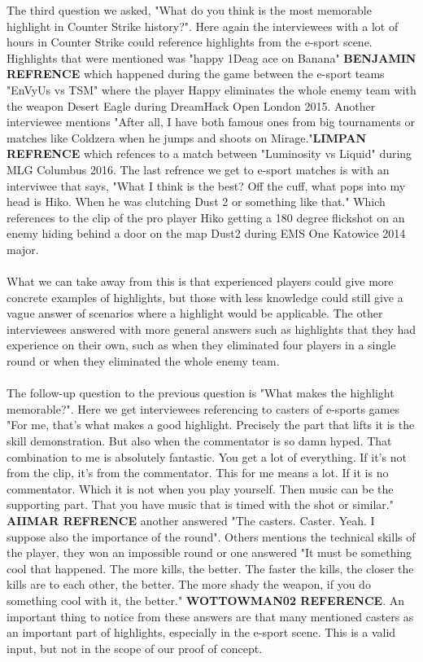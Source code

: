 The third question we asked, "What do you think is the most memorable highlight in Counter Strike history?". Here again the interviewees with a lot of hours in Counter Strike could reference highlights from the e-sport scene. Highlights that were mentioned was "happy 1Deag ace on Banana" \textbf{BENJAMIN REFRENCE} which happened during the game between the e-sport teams "EnVyUs vs TSM" where the player Happy eliminates the whole enemy team with the weapon Desert Eagle during DreamHack Open London 2015. Another interviewee mentions "After all, I have both famous ones from big tournaments or matches like Coldzera when he jumps and shoots on Mirage."\textbf{LIMPAN REFRENCE} which refences to a match between "Luminosity vs Liquid" during MLG Columbus 2016. The last refrence we get to e-sport matches is with an interviwee that says, "What I think is the best? Off the cuff, what pops into my head is Hiko. When he was clutching Dust 2 or something like that." Which references to the clip of the pro player Hiko getting a 180 degree flickshot on an enemy hiding behind a door on the map Dust2 during EMS One Katowice 2014 major.\\\\ 
What we can take away from this is that experienced players could give more concrete examples of highlights, but those with less knowledge could still give a vague answer of scenarios where a highlight would be applicable. 
The other interviewees answered with more general answers such as highlights that they had experience on their own, such as when they eliminated four players in a single round or when they eliminated the whole enemy team.\\\\
The follow-up question to the previous question is "What makes the highlight memorable?". Here we get interviewees referencing to casters of e-sports games "For me, that's what makes a good highlight. Precisely the part that lifts it is the skill demonstration. But also when the commentator is so damn hyped. That combination to me is absolutely fantastic. You get a lot of everything. If it's not from the clip, it's from the commentator. This for me means a lot. If it is no commentator. Which it is not when you play yourself. Then music can be the supporting part. That you have music that is timed with the shot or similar." \textbf{AIIMAR REFRENCE} another answered "The casters. Caster. Yeah. I suppose also the importance of the round". Others mentions the technical skills of the player, they won an impossible round or one answered "It must be something cool that happened. The more kills, the better. The faster the kills, the closer the kills are to each other, the better. The more shady the weapon, if you do something cool with it, the better." \textbf{WOTTOWMAN02 REFERENCE}. An important thing to notice from these answers are that many mentioned casters as an important part of highlights, especially in the e-sport scene. This is a valid input, but not in the scope of our proof of concept.\\\\

